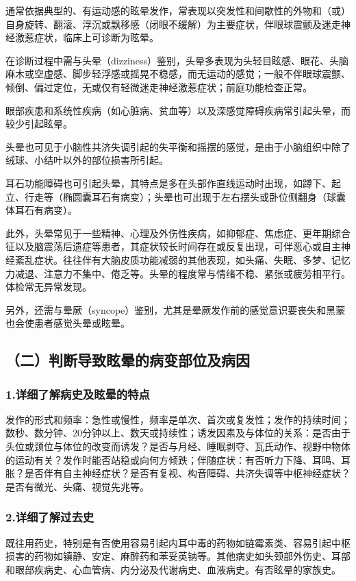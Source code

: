 通常依据典型的、有运动感的眩晕发作，常表现以突发性和间歇性的外物和（或）自身旋转、翻滚、浮沉或飘移感（闭眼不缓解）为主要症状，伴眼球震颤及迷走神经激惹症状，临床上可诊断为眩晕。

在诊断过程中需与头晕（dizziness）鉴别，头晕多表现为头轻目眩感、眼花、头脑麻木或空虚感、脚步轻浮感或摇晃不稳感，而无运动的感觉；一般不伴眼球震颤、倾倒、偏过定位，无或仅有轻微迷走神经激惹症状；前庭功能检查正常。

眼部疾患和系统性疾病（如心脏病、贫血等）以及深感觉障碍疾病常引起头晕，而较少引起眩晕。

头晕也可见于小脑性共济失调引起的失平衡和摇摆的感觉，是由于小脑组织中除了绒球、小结叶以外的部位损害所引起。

耳石功能障碍也可引起头晕，其特点是多在头部作直线运动时出现，如蹲下、起立、行走等（椭圆囊耳石有病变）；头晕也可出现于左右摆头或卧位侧翻身（球囊体耳石有病变）。

此外，头晕常见于一些精神、心理及外伤性疾病，如抑郁症、焦虑症、更年期综合征以及脑震荡后遗症等患者，其症状较长时间存在或反复出现，可伴恶心或自主神经紊乱症状。往往伴有大脑皮质功能减弱的其他表现，如头痛、失眠、多梦、记忆力减退、注意力不集中、倦乏等。头晕的程度常与情绪不稳、紧张或疲劳相平行。体检常无异常发现。

另外，还需与晕厥（syncope）鉴别，尤其是晕厥发作前的感觉意识要丧失和黑蒙也会使患者感觉头晕或眩晕。

\subsection{（二）判断导致眩晕的病变部位及病因}

\subsubsection{1.详细了解病史及眩晕的特点}

发作的形式和频率：急性或慢性，频率是单次、首次或复发性；发作的持续时间；数秒、数分钟、20分钟以上、数天或持续性；诱发因素及与体位的关系：是否由于头位或颈位与体位的改变而诱发？是否与月经、睡眠剥夺、瓦氏动作、视野中物体的运动有关？发作时能否站稳或向何方倾跌；伴随症状：有否听力下降、耳鸣、耳胀？是否伴有自主神经症状？是否有复视、构音障碍、共济失调等中枢神经症状？是否有微光、头痛、视觉先兆等。

\subsubsection{2.详细了解过去史}

既往用药史，特别是有否使用容易引起内耳中毒的药物如链霉素类、容易引起中枢损害的药物如镇静、安定、麻醉药和苯妥英钠等。其他病史如头颈部外伤史、耳部和眼部疾病史、心血管病、内分泌及代谢病史、血液病史。有否眩晕的家族史。

